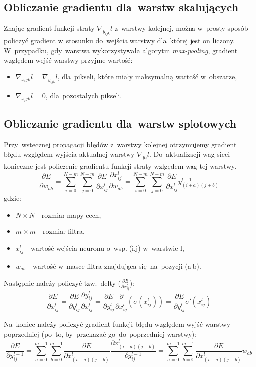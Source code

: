\subsection{Obliczanie gradientu dla~warstw skalujących}
Znając gradient funkcji straty $\nabla_{y_{ijk}}l$ z~warstwy kolejnej, można w~prosty sposób policzyć gradient
w~stosunku do~wejścia warstwy dla~której jest on liczony. W~przypadku, gdy~warstwa wykorzystywała algorytm
\textit{max-pooling}, gradient względem wejść warstwy przyjme wartość:
\begin{itemize}
  \item $\nabla_{x_ijk}l = \nabla_{y_{ijk}}l$, dla~pikseli, które miały maksymalną wartość w~obszarze, 
  \item $\nabla_{x_ijk}l = 0$, dla~pozostałych pikseli.
\end{itemize}

\subsection{Obliczanie gradientu dla~warstw splotowych}
Przy~wstecznej propagacji błędów z~warstwy kolejnej otrzymujemy gradient błędu względem wyjścia
aktualnej warstwy $\nabla_{y_j}l$. Do~aktualizacji wag sieci konieczne jest policzenie gradientu funkcji
straty wzlgędem wag tej warstwy.
$$ \frac{\partial E}{\partial w_{ab}} 
= \sum\limits_{i=0}^{N-m}\sum\limits_{j=0}^{N-m}\frac{\partial E}{\partial x_{ij}^l}\frac{\partial
x_{ij}^l}{\partial w_{ab}}
= \sum\limits_{i=0}^{N-m}\sum\limits_{j=0}^{N-m}\frac{\partial E}{\partial x_{ij}^l}y^{l-1}_{(i+a)(j+b)}$$
gdzie:
\begin{itemize}
  \item $N\times N$ - rozmiar mapy cech,
  \item $m\times m$ - rozmiar filtra,
  \item $x_{ij}^l$ - wartość wejścia neuronu o~wsp. (i,j) w~warstwie l,
  \item $w_{ab}$ - wartość w~masce filtra znajdująca się~na~pozycji (a,b).
\end{itemize}

Następnie należy policzyć tzw.~delty ($\frac{\partial E}{\partial x_{ij}^l}$):
$$\frac{\partial E}{\partial x_{ij}^l} = \frac{\partial E}{\partial y_{ij}^l}\frac{\partial y_{ij}^l}{\partial
x_{ij}^l} =
\frac{\partial E}{\partial y_{ij}^l}\frac{\partial}{\partial x_{ij}^l}(\sigma(x_{ij}^l))
= \frac{\partial E}{\partial y_{ij}^l}\sigma'(x_{ij}^l)
$$

Na~koniec należy policzyć gradient funkcji błędu względem wyjść warstwy poprzedniej (po~to, by~przekazać
go~do~poprzedniej warstwy):
$$ \frac{\partial E}{\partial y_{ij}^{l-1}} =
\sum\limits_{a=0}^{m-1}\sum\limits_{b=0}^{m-1} \frac{\partial E}{\partial x^l_{(i-a)(j-b)}}
\frac{\partial x^l_{(i-a)(j-b)}}{\partial y_{ij}^{l-1}} =
\sum\limits_{a=0}^{m-1}\sum\limits_{b=0}^{m-1} \frac{\partial E}{\partial x^l_{(i-a)(j-b)}}w_{ab}$$

